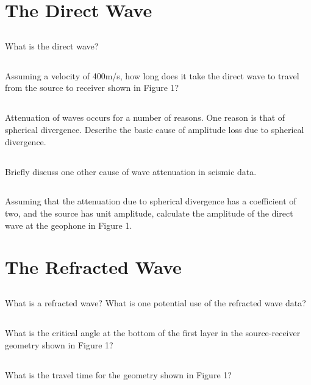 \section{The Direct Wave}
\subsection{}
What is the direct wave?
\subsection{}
Assuming a velocity of 400m/s, how long does it take the direct wave to travel from the source to receiver shown in Figure 1?
\subsection{}
Attenuation of waves occurs for a number of reasons. One reason is that of spherical divergence. Describe the basic cause of amplitude loss due to spherical divergence.
\subsection{}
Briefly discuss one other cause of wave attenuation in seismic data.
\subsection{}
Assuming that the attenuation due to spherical divergence has a coefficient of two, and the source has unit amplitude, calculate the amplitude of the direct wave at the geophone in Figure 1.
\section{The Refracted Wave}
\subsection{}
What is a refracted wave? What is one potential use of the refracted wave data?
\subsection{}
What is the critical angle at the bottom of the first layer in the source-receiver geometry shown in Figure 1?
\subsection{}
What is the travel time for the geometry shown in Figure 1?
\newpage
